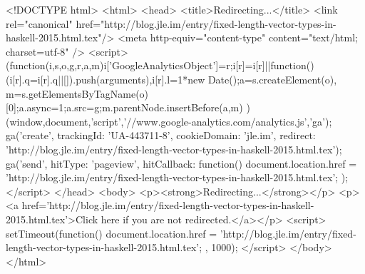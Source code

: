 <!DOCTYPE html>
<html>
<head>
<title>Redirecting...</title>
<link rel="canonical" href="http://blog.jle.im/entry/fixed-length-vector-types-in-haskell-2015.html.tex"/>
<meta http-equiv="content-type" content="text/html; charset=utf-8" />
<script>
(function(i,s,o,g,r,a,m){i['GoogleAnalyticsObject']=r;i[r]=i[r]||function(){
(i[r].q=i[r].q||[]).push(arguments)},i[r].l=1*new Date();a=s.createElement(o),
m=s.getElementsByTagName(o)[0];a.async=1;a.src=g;m.parentNode.insertBefore(a,m)
})(window,document,'script','//www.google-analytics.com/analytics.js','ga');
ga('create', { trackingId: 'UA-443711-8', cookieDomain: 'jle.im', redirect: 'http://blog.jle.im/entry/fixed-length-vector-types-in-haskell-2015.html.tex'});
ga('send', { hitType: 'pageview', hitCallback: function() { document.location.href = 'http://blog.jle.im/entry/fixed-length-vector-types-in-haskell-2015.html.tex'; } });
</script>
</head>
<body>
  <p><strong>Redirecting...</strong></p>
  <p><a href='http://blog.jle.im/entry/fixed-length-vector-types-in-haskell-2015.html.tex'>Click here if you are not redirected.</a></p>
  <script>
    setTimeout(function() { document.location.href = 'http://blog.jle.im/entry/fixed-length-vector-types-in-haskell-2015.html.tex'; }, 1000);
  </script>
</body>
</html>
